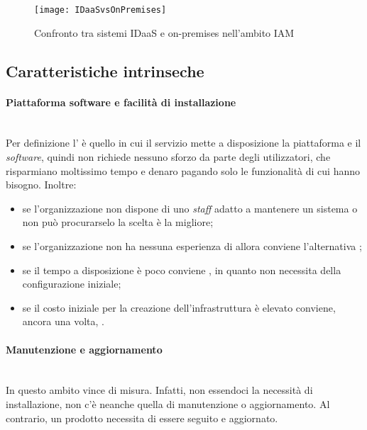 \begin{figure}[hbpc]
\begin{center}
\texttt{[image: IDaaSvsOnPremises]}
\caption[Confronto tra sistemi IDaaS e on-premises nell'ambito IAM]{Confronto tra sistemi IDaaS e on-premises nell'ambito IAM\protect\footnotemark}
\label{fig:IDaaSvsOnPremises}
\end{center}
\end{figure}

\subsection{Caratteristiche intrinseche}
\paragraph{Piattaforma software e facilità di installazione} \mbox{} \\
Per definizione l' è quello in cui il servizio mette a disposizione la piattaforma e il \textit{software}, quindi non richiede nessuno sforzo da parte degli utilizzatori, che risparmiano moltissimo tempo e denaro pagando solo le funzionalità di cui hanno bisogno. Inoltre:
\begin{itemize}
\item se l'organizzazione non dispone di uno \textit{staff} adatto a mantenere un sistema  o non può procurarselo la scelta  è la migliore;
\item se l'organizzazione non ha nessuna esperienza di  allora conviene l'alternativa ;
\item se il tempo a disposizione è poco conviene , in quanto non necessita della configurazione iniziale;
\item se il costo iniziale per la creazione dell'infrastruttura è elevato conviene, ancora una volta, .
\end{itemize}

\paragraph{Manutenzione e aggiornamento} \mbox{} \\
In questo ambito  vince di misura. Infatti, non essendoci la necessità di installazione, non c'è neanche quella di manutenzione o aggiornamento. Al contrario, un prodotto  necessita di essere seguito e aggiornato.

